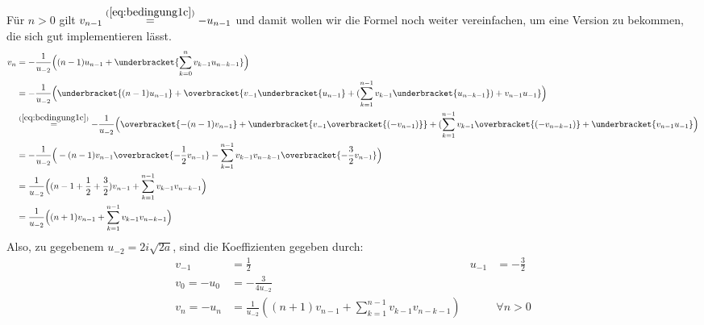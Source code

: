 \begin{comment}
und analog, für $n=1$ und $n=2$
\begin{align*}
v_1&= -\frac{3}{2u_{-2}^2} = \frac{3}{16a} = -u_1 &\mbox{und}
  & & v_2&= -\frac{63}{16u_{-2}^3} = -\frac{63i}{256a\sqrt{2a}} = -u_2 \,.
\end{align*}
Die letzten zwei Paare sind für die Berechnung nicht von bedeutung und dienen
nur dazu, das Programm zu prüfen.
\end{comment}

Für $n>0$ gilt $v_{n-1}\overset{(\ref{eq:bedingung1c})}{=}-u_{n-1}$ und damit
wollen wir die Formel noch weiter vereinfachen, um eine Version zu bekommen,
die sich gut implementieren lässt.
\begin{align*}
v_{n} &= -\frac{1}{u_{-2}}
  \Big((n-1)u_{n-1} + \underbracket{\sum_{k=0}^{n} v_{k-1}u_{n-k-1}}\Big)
\\&= -\frac{1}{u_{-2}}
  \Big(\underbracket{(n-1)u_{n-1}} + \overbracket{v_{-1}\underbracket{u_{n-1}}
  + (\sum_{k=1}^{n-1} v_{k-1}\underbracket{u_{n-k-1}}) + v_{n-1}u_{-1}}\Big)
\\&\overset{(\ref{eq:bedingung1c})}{=} -\frac{1}{u_{-2}}
  \Big(\overbracket{-(n-1)v_{n-1}} + \underbracket{v_{-1}\overbracket{(-v_{n-1})}}
  + (\sum_{k=1}^{n-1} v_{k-1}\overbracket{(-v_{n-k-1})}
  + \underbracket{v_{n-1}u_{-1}}\Big)
\\&= -\frac{1}{u_{-2}} \Big(-(n-1)v_{n-1} \overbracket{-\frac{1}{2}v_{n-1}}
  - \sum_{k=1}^{n-1} v_{k-1}v_{n-k-1} \overbracket{- \frac{3}{2} v_{n-1}}\Big)
\\&= \frac{1}{u_{-2}} \Big((n-1+\frac{1}{2}+\frac{3}{2})v_{n-1}
  + \sum_{k=1}^{n-1} v_{k-1}v_{n-k-1}\Big)
\\&= \frac{1}{u_{-2}} \Big((n+1)v_{n-1} + \sum_{k=1}^{n-1} v_{k-1}v_{n-k-1}\Big)
\end{align*}
Also, zu gegebenem $u_{-2}=2i\sqrt{2a}$, sind die Koeffizienten gegeben durch:
\begin{align*}
v_{-1}&=\frac{1}{2} & u_{-1}&=-\frac{3}{2}
\\v_{0} = -u_{0} &= -\frac{3}{4u_{-2}}
\\v_n = - u_n &= \frac{1}{u_{-2}}
  \left((n+1)v_{n-1} + \sum_{k=1}^{n-1} v_{k-1}v_{n-k-1}\right)
  & & \forall n > 0
\end{align*}


